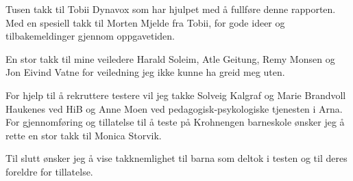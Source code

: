 

Tusen takk til Tobii Dynavox som har hjulpet med å fullføre denne rapporten. Med en spesiell takk til Morten Mjelde fra Tobii, for gode ideer og tilbakemeldinger gjennom oppgavetiden. 

En stor takk til mine veiledere Harald Soleim, Atle Geitung, Remy Monsen og Jon Eivind Vatne for veiledning jeg ikke kunne ha greid meg uten.

For hjelp til å rekruttere testere vil jeg takke Solveig Kalgraf og Marie Brandvoll Haukenes ved HiB og Anne Moen ved pedagogisk-psykologiske tjenesten i Arna. For gjennomføring og tillatelse til å teste på Krohnengen barneskole ønsker jeg å rette en stor takk til Monica Storvik.

Til slutt ønsker jeg å vise takknemlighet til barna som deltok i testen og til deres foreldre for tillatelse.
